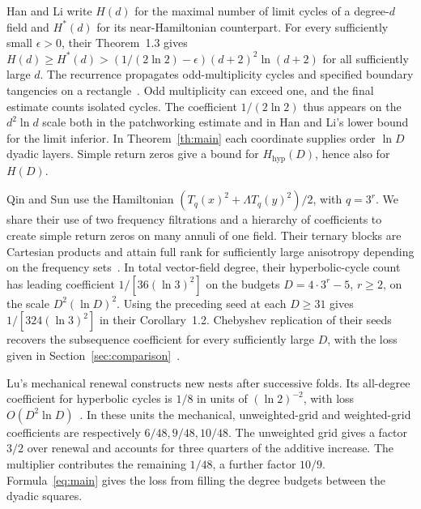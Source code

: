 \documentclass[11pt,a4paper]{amsart}
\numberwithin{equation}{section}
\newcommand{\HH}{H_{\mathrm{hyp}}}
\begin{document}
Han and Li write \(H(d)\) for the maximal number of limit cycles of a degree-\(d\) field and \(H^*(d)\) for its near-Hamiltonian counterpart. For every sufficiently small \(\epsilon>0\), their Theorem~1.3 gives \(H(d)\ge H^*(d)>(1/(2\ln2)-\epsilon)(d+2)^2\ln(d+2)\) for all sufficiently large \(d\). The recurrence propagates odd-multiplicity cycles and specified boundary tangencies on a rectangle~\cite[Theorems 1.3 and 2.1]{hanli}. Odd multiplicity can exceed one, and the final estimate counts isolated cycles. The coefficient \(1/(2\ln2)\) thus appears on the \(d^2\ln d\) scale both in the patchworking estimate and in Han and Li's lower bound for the limit inferior. In Theorem~\ref{th:main} each coordinate supplies order \(\ln D\) dyadic layers. Simple return zeros give a bound for \(\HH(D)\), hence also for \(H(D)\).

Qin and Sun use the Hamiltonian \((T_q(x)^2+\Lambda T_q(y)^2)/2\), with \(q=3^r\). We share their use of two frequency filtrations and a hierarchy of coefficients to create simple return zeros on many annuli of one field. Their ternary blocks are Cartesian products and attain full rank for sufficiently large anisotropy depending on the frequency sets~\cite[Theorems 1.1 and 2.2, Proposition 5.2]{qin}. In total vector-field degree, their hyperbolic-cycle count has leading coefficient \(1/[36(\ln3)^2]\) on the budgets \(D=4\cdot3^r-5\), \(r\ge2\), on the scale \(D^2(\ln D)^2\). Using the preceding seed at each \(D\ge31\) gives \(1/[324(\ln3)^2]\) in their Corollary~1.2. Chebyshev replication of their seeds recovers the subsequence coefficient for every sufficiently large \(D\), with the loss given in Section~\ref{sec:comparison}~\cite[Proposition 5.2]{mechanical}.

Lu's mechanical renewal constructs new nests after successive folds. Its all-degree coefficient for hyperbolic cycles is \(1/8\) in units of \((\ln2)^{-2}\), with loss \(O(D^2\ln D)\)~\cite[Theorem 1.1]{mechanical}. In these units the mechanical, unweighted-grid and weighted-grid coefficients are respectively \(6/48,9/48,10/48\). The unweighted grid gives a factor \(3/2\) over renewal and accounts for three quarters of the additive increase. The multiplier contributes the remaining \(1/48\), a further factor \(10/9\). Formula~\eqref{eq:main} gives the loss from filling the degree budgets between the dyadic squares.
\end{document}
